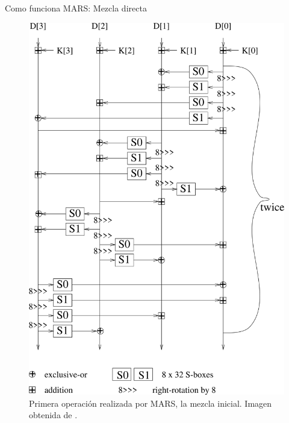 \documentclass{beamer}
\begin{document}
\begin{frame}{Como funciona MARS: Mezcla directa}
	\begin{figure}[H]
		\centering
		\includegraphics[scale = 0.38]{mezcla_directa.png}
		\caption{Primera operación realizada por MARS, la mezcla inicial. Imagen obtenida de \cite{ampliacionPropuestaMARS}.} \label{fig:mezcla_directa}
	\end{figure}
\end{frame}
\end{document}
